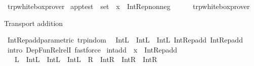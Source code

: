 \begin{isabellebody}
\ trp{\isacharunderscore}{\kern0pt}whitebox{\isacharunderscore}{\kern0pt}prover%
\endisatagproof
{\isafoldproof}%
%
\isadelimproof
%
\endisadelimproof
\isanewline
\isanewline
{}\isamarkupfalse%
\ apptest\ {\isacharcolon}{\kern0pt}{\isacharcolon}{\kern0pt}\ {\isachardoublequoteopen}set{\isachardoublequoteclose}\ \ x\ {\isacharequal}{\kern0pt}\ {\isachardoublequoteopen}Int{\isacharunderscore}{\kern0pt}Rep{\isacharunderscore}{\kern0pt}nonneg\ {}{\isachardoublequoteclose}\ {\isacharbang}{\kern0pt}\isanewline
%
\isadelimproof
\ \ %
\endisadelimproof
%
\isatagproof
{}\isamarkupfalse%
\ trp{\isacharunderscore}{\kern0pt}whitebox{\isacharunderscore}{\kern0pt}prover%
\endisatagproof
{\isafoldproof}%
%
\isadelimproof
%
\endisadelimproof
%
\begin{isamarkuptext}%
Transport addition%
\end{isamarkuptext}\isamarkuptrue%
\isamarkupfalse%
\ Int{\isacharunderscore}{\kern0pt}Rep{\isacharunderscore}{\kern0pt}add{\isacharunderscore}{\kern0pt}parametric\ {\isacharbrackleft}{\kern0pt}trp{\isacharunderscore}{\kern0pt}in{\isacharunderscore}{\kern0pt}dom{\isacharbrackright}{\kern0pt}{\isacharcolon}{\kern0pt}\isanewline
\ \ {\isachardoublequoteopen}{\isacharparenleft}{\kern0pt}Int{\isachardot}{\kern0pt}L\ {\isasymRrightarrow}\ Int{\isachardot}{\kern0pt}L\ {\isasymRrightarrow}\ Int{\isachardot}{\kern0pt}L{\isacharparenright}{\kern0pt}\ Int{\isacharunderscore}{\kern0pt}Rep{\isacharunderscore}{\kern0pt}add\ Int{\isacharunderscore}{\kern0pt}Rep{\isacharunderscore}{\kern0pt}add{\isachardoublequoteclose}\isanewline
%
\isadelimproof
\ \ %
\endisadelimproof
%
\isatagproof
{}\isamarkupfalse%
\ {\isacharparenleft}{\kern0pt}intro\ Dep{\isacharunderscore}{\kern0pt}Fun{\isacharunderscore}{\kern0pt}Rel{\isacharunderscore}{\kern0pt}relI{\isacharparenright}{\kern0pt}\ fastforce%
\endisatagproof
{\isafoldproof}%
%
\isadelimproof
\isanewline
%
\endisadelimproof
\isanewline
{}\isamarkupfalse%
\ int{\isacharunderscore}{\kern0pt}add\ \ x\ {\isacharequal}{\kern0pt}\ Int{\isacharunderscore}{\kern0pt}Rep{\isacharunderscore}{\kern0pt}add\isanewline
\ \ \ L\ {\isacharequal}{\kern0pt}\ {\isachardoublequoteopen}Int{\isachardot}{\kern0pt}L\ {\isasymRrightarrow}\ Int{\isachardot}{\kern0pt}L\ {\isasymRrightarrow}\ Int{\isachardot}{\kern0pt}L{\isachardoublequoteclose}\ \ R\ {\isacharequal}{\kern0pt}\ {\isachardoublequoteopen}Int{\isachardot}{\kern0pt}R\ {\isasymRrightarrow}\ Int{\isachardot}{\kern0pt}R\ {\isasymRrightarrow}\ Int{\isachardot}{\kern0pt}R{\isachardoublequoteclose}\isanewline

\end{isabellebody}
